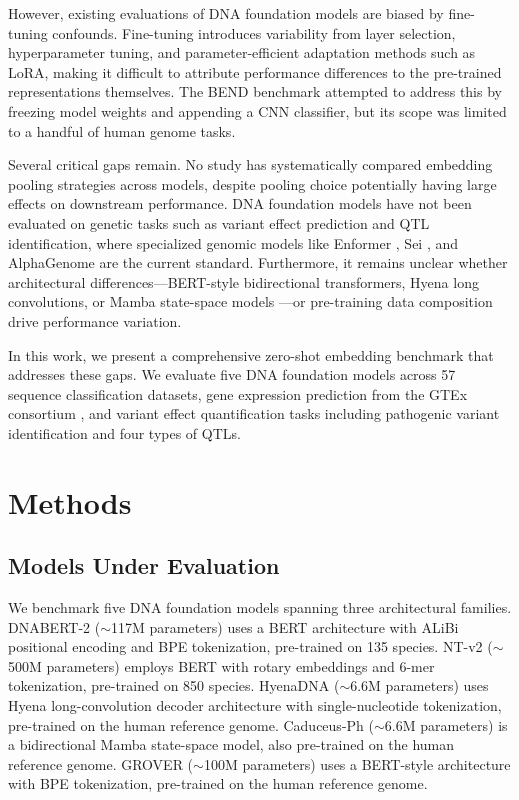 \documentclass[11pt]{article}
\begin{document}
However, existing evaluations of DNA foundation models are biased by fine-tuning confounds. Fine-tuning introduces variability from layer selection, hyperparameter tuning, and parameter-efficient adaptation methods such as LoRA, making it difficult to attribute performance differences to the pre-trained representations themselves. The BEND benchmark \citep{gresova2023bend} attempted to address this by freezing model weights and appending a CNN classifier, but its scope was limited to a handful of human genome tasks.

Several critical gaps remain. No study has systematically compared embedding pooling strategies across models, despite pooling choice potentially having large effects on downstream performance. DNA foundation models have not been evaluated on genetic tasks such as variant effect prediction and QTL identification, where specialized genomic models like Enformer \citep{avsec2021enformer}, Sei \citep{chen2022sei}, and AlphaGenome \citep{chen2024alphagenome} are the current standard. Furthermore, it remains unclear whether architectural differences---BERT-style bidirectional transformers, Hyena long convolutions, or Mamba state-space models \citep{gu2024mamba}---or pre-training data composition drive performance variation.

In this work, we present a comprehensive zero-shot embedding benchmark that addresses these gaps. We evaluate five DNA foundation models across 57 sequence classification datasets, gene expression prediction from the GTEx consortium \citep{gtex2020gtex}, and variant effect quantification tasks including pathogenic variant identification and four types of QTLs.

\section{Methods}

\subsection{Models Under Evaluation}

We benchmark five DNA foundation models spanning three architectural families. DNABERT-2 ($\sim$117M parameters) uses a BERT architecture with ALiBi positional encoding and BPE tokenization, pre-trained on 135 species. NT-v2 ($\sim$500M parameters) employs BERT with rotary embeddings and 6-mer tokenization, pre-trained on 850 species. HyenaDNA ($\sim$6.6M parameters) uses Hyena long-convolution decoder architecture with single-nucleotide tokenization, pre-trained on the human reference genome. Caduceus-Ph ($\sim$6.6M parameters) is a bidirectional Mamba state-space model, also pre-trained on the human reference genome. GROVER ($\sim$100M parameters) uses a BERT-style architecture with BPE tokenization, pre-trained on the human reference genome.
\end{document}
